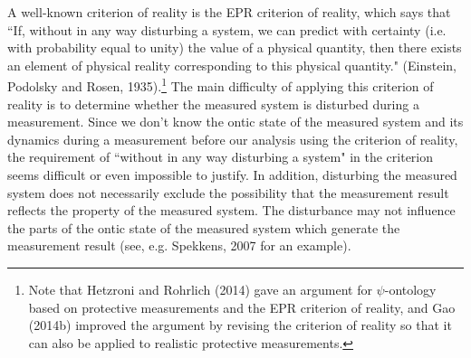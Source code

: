 A well-known criterion of reality is the EPR criterion of reality, which says that  ``If, without in any way disturbing a system, we can predict with certainty ({i.e.} with probability equal to unity) the value of a physical quantity, then there exists an element of physical reality corresponding to this physical quantity." (Einstein, Podolsky and Rosen, 1935).\footnote{Note that Hetzroni and Rohrlich (2014) gave an argument for $\psi$-ontology based on protective measurements and the EPR criterion of reality, and Gao (2014b) improved the argument by revising the criterion of reality so that it can also be applied to realistic protective measurements.} 
The main difficulty of applying this criterion of reality is to determine whether the measured system is disturbed during a measurement. 
Since we don't know the ontic state of the measured system and its dynamics during a measurement before our analysis using the criterion of reality, the requirement of ``without in any way disturbing a system" in the criterion seems difficult or even impossible to justify. In addition, disturbing the measured system does not necessarily exclude the possibility that the measurement result reflects the property of the measured system. The disturbance may not influence the parts of the ontic state of the measured system which generate the measurement result (see, e.g.  Spekkens, 2007 for an example). 

